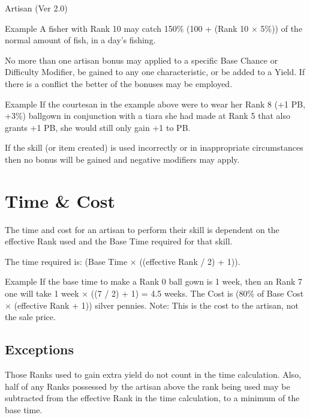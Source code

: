 \begin{Chapter}{Artisan (Ver 2.0)}
\begin{Description}
\item[Example ]A fisher with Rank 10 may catch 150\% (100 + (Rank 10 ×
  5\%)) of the normal amount of fish, in a day’s fishing.

\end{Description}

No more than one artisan bonus may applied to a specific Base Chance
or Difficulty Modifier, be gained to any one characteristic, or be
added to a Yield. If there is a conflict the better of the bonuses may
be employed.

\begin{Description}

\item[Example] If the courtesan in the example above were to wear her
  Rank 8 (+1 PB, +3\%) ballgown in conjunction with a tiara she had
  made at Rank 5 that also grants +1 PB, she would still only gain +1
  to PB.

\end{Description}

If the skill (or item created) is used incorrectly or in inappropriate
circumstances then no bonus will be gained and negative modifiers may
apply.

\section{Time \& Cost}

The time and cost for an artisan to perform their skill is dependent
on the effective Rank used and the Base Time required for that skill.

The time required is: (Base Time × ((effective Rank / 2) + 1)).

\begin{Description}
\item[Example] If the base time to make a Rank 0 ball gown is 1 week,
  then an Rank 7 one will take 1 week × ((7 / 2) + 1) = 4.5 weeks.
  The Cost is (80\% of Base Cost × (effective Rank + 1)) silver
  pennies. Note: This is the cost to the artisan, not the sale price.
\end{Description}

\subsection{Exceptions}

Those Ranks used to gain extra yield do not count in the time
calculation.  Also, half of any Ranks possessed by the artisan above
the rank being used may be subtracted from the effective Rank in the
time calculation, to a minimum of the base time.


\end{Chapter}
